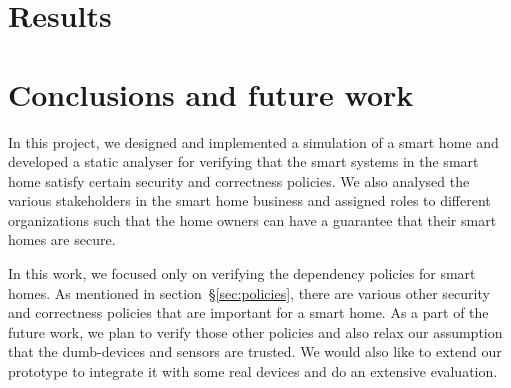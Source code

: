 \documentclass{article}
\begin{document}
\section{Results}

\section{Conclusions and future work}
In this project, we designed and implemented a simulation of a smart home and developed a static analyser for verifying that the smart systems in the smart home satisfy certain security and correctness policies. We also analysed the various stakeholders in the smart home business and assigned roles to different organizations such that the home owners can have a guarantee that their smart homes are secure. 

In this work, we focused only on verifying the dependency policies for smart homes. As mentioned in section~\S\ref{sec:policies}, there are various other security and correctness policies that are important for a smart home. As a part of the future work, we plan to verify those other policies and also relax our assumption that the dumb-devices and sensors are trusted. We would also like to extend our prototype to integrate it with some real devices and do an extensive evaluation.


\end{document}
